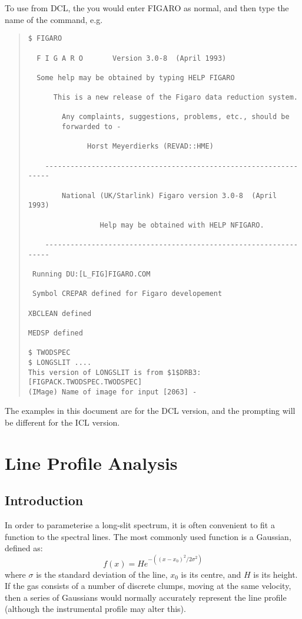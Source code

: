 To use from DCL, the you would enter FIGARO as normal, and then type the
name of the command, e.g.
\begin{quote}\begin{verbatim}
$ FIGARO

  F I G A R O       Version 3.0-8  (April 1993)

  Some help may be obtained by typing HELP FIGARO

      This is a new release of the Figaro data reduction system.

        Any complaints, suggestions, problems, etc., should be
        forwarded to -

              Horst Meyerdierks (REVAD::HME)

    -----------------------------------------------------------------

        National (UK/Starlink) Figaro version 3.0-8  (April 1993)

                 Help may be obtained with HELP NFIGARO.

    -----------------------------------------------------------------

 Running DU:[L_FIG]FIGARO.COM

 Symbol CREPAR defined for Figaro developement

XBCLEAN defined

MEDSP defined

$ TWODSPEC
$ LONGSLIT ....
This version of LONGSLIT is from $1$DRB3:[FIGPACK.TWODSPEC.TWODSPEC]
(IMage) Name of image for input [2063] -
\end{verbatim}\end{quote}
The examples in this document are for the DCL version, and the prompting
will be different for the ICL version.

\section{Line Profile Analysis}

\subsection{Introduction}

In order to parameterise a long-slit spectrum, it is often
convenient to fit a function to the spectral lines.
The most commonly used function is a Gaussian, defined as:
\[
     f(x) = H e^{-((x-x_{0})^{2}/2\sigma^{2})}
\]
where $\sigma$ is the standard deviation of the line, $x_{0}$ is its
centre, and $H$ is its height.
If the gas consists of a number of discrete clumps, moving at the same
velocity, then a series of Gaussians would normally accurately represent
the line profile (although the instrumental profile may alter this).

